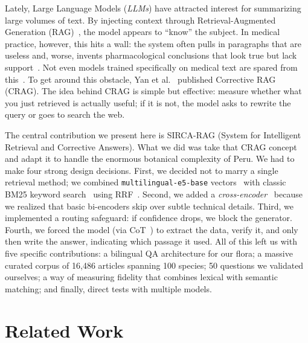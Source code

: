 \documentclass[runningheads]{llncs}
\newcommand{\sirca}{\textsc{SIRCA-RAG}}
\begin{document}
Lately, Large Language Models (\emph{LLMs}) have attracted interest for summarizing large volumes of text. By injecting context through Retrieval-Augmented Generation (RAG)~\cite{lewis2020retrieval}, the model appears to ``know'' the subject. In medical practice, however, this hits a wall: the system often pulls in paragraphs that are useless and, worse, invents pharmacological conclusions that look true but lack support~\cite{gao2024retrieval,ji2023survey}. Not even models trained specifically on medical text are spared from this~\cite{lee2020biobert,gu2021domain}. To get around this obstacle, Yan et al.~\cite{yan2024crag} published Corrective RAG (CRAG). The idea behind CRAG is simple but effective: measure whether what you just retrieved is actually useful; if it is not, the model asks to rewrite the query or goes to search the web.

The central contribution we present here is \sirca{} (System for Intelligent Retrieval and Corrective Answers). What we did was take that CRAG concept and adapt it to handle the enormous botanical complexity of Peru. We had to make four strong design decisions. First, we decided not to marry a single retrieval method; we combined \texttt{multilingual-e5-base} vectors~\cite{wang2024e5} with classic BM25 keyword search~\cite{robertson2009bm25} using RRF~\cite{cormack2009rrf}. Second, we added a \emph{cross-encoder}~\cite{nogueira2019passage} because we realized that basic bi-encoders skip over subtle technical details. Third, we implemented a routing safeguard: if confidence drops, we block the generator. Fourth, we forced the model (via CoT~\cite{wei2022chain}) to extract the data, verify it, and only then write the answer, indicating which passage it used. All of this left us with five specific contributions: a bilingual QA architecture for our flora; a massive curated corpus of 16{,}486 articles spanning 100 species; 50 questions we validated ourselves; a way of measuring fidelity that combines lexical with semantic matching; and finally, direct tests with multiple models.

\section{Related Work}
\label{sec:related}
\end{document}
